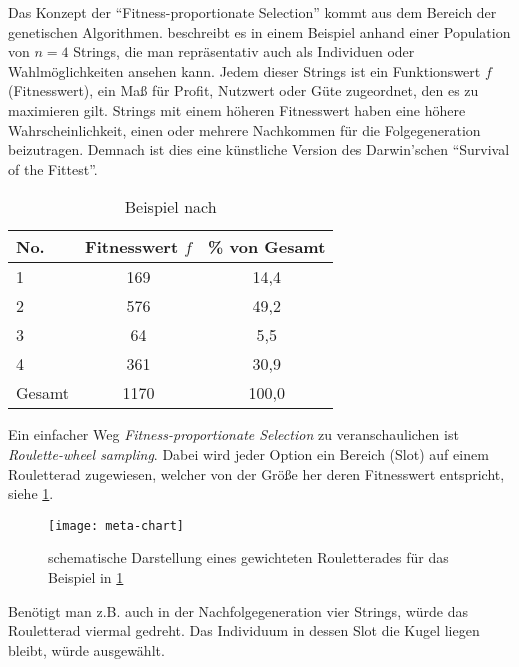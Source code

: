 Das Konzept der \enquote{Fitness-proportionate Selection} kommt aus dem Bereich der genetischen Algorithmen. 
\cite{gen-algo} beschreibt es in einem Beispiel anhand einer Population von $n=4$ Strings, die man repräsentativ auch als Individuen oder Wahlmöglichkeiten ansehen kann. 
Jedem dieser Strings ist ein Funktionswert $f$ (Fitnesswert), ein Maß für Profit, Nutzwert oder Güte zugeordnet, den es zu maximieren gilt. 
Strings mit einem höheren Fitnesswert haben eine höhere Wahrscheinlichkeit, einen oder mehrere Nachkommen für die Folgegeneration beizutragen.
Demnach ist dies eine künstliche Version des Darwin'schen \enquote{Survival of the Fittest}.

\begin{table}[ht]
\begin{center}
\setlength{\tabcolsep}{0.5em} %
{\renewcommand{\arraystretch}{1.2}%
\begin{tabular}{| l  c  c |}
\hline 
No. & Fitnesswert $f$ & \% von Gesamt \\ \hline 
1 & 169 & 14,4 \\ 
2 & 576 & 49,2 \\ 
3 & 64 & 5,5 \\ 
4 & 361 & 30,9 \\ \hline
Gesamt & 1170 & 100,0 \\ \hline
\end{tabular}
}
\caption{Beispiel nach \cite[Table 1.1]{gen-algo}}
\label{tab:beispiel-tabelle-roulette}
\end{center}
\end{table}

Ein einfacher Weg \textit{Fitness-proportionate Selection} zu veranschaulichen ist \textit{Roulette-wheel sampling}. 
Dabei wird jeder Option ein Bereich (Slot) auf einem Rouletterad zugewiesen, welcher von der Größe her deren Fitnesswert entspricht, siehe \cref{figure:meta-chart}. 

\begin{figure}[hptb]
 \centering
 \texttt{[image: meta-chart]}
 \caption[gewichtetes Roulette-Rad (fitness-proportionate selection]
 		{schematische Darstellung eines gewichteten Rouletterades für das Beispiel in \cref{tab:beispiel-tabelle-roulette}}
 \label{figure:meta-chart}
\end{figure}

Benötigt man z.B. auch in der Nachfolgegeneration vier Strings, würde das Rouletterad viermal gedreht.
Das Individuum in dessen Slot die Kugel liegen bleibt, würde ausgewählt.

